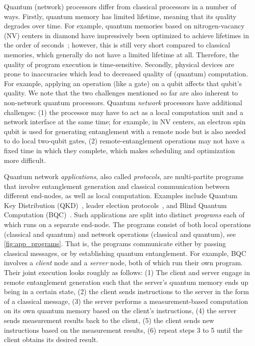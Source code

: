 Quantum (network) processors differ from classical processors in a number of ways.
Firstly, quantum memory has limited lifetime, meaning that its quality degrades over time.
For example, quantum memories based on nitrogen-vacancy (NV) centers in diamond have impressively been optimized to achieve lifetimes in the order of seconds~\cite{Abobeih2018};
however, this is still very short compared to classical memories, which generally do not have a limited lifetime at all.
Therefore, the quality of program execution is time-sensitive.
Secondly, physical devices are prone to inaccuracies which lead to decreased quality of (quantum) computation.
For example, applying an operation (like a gate) on a qubit affects that qubit's quality.
We note that the two challenges mentioned so far are also inherent to non-network quantum processors.
Quantum \textit{network} processors have additional challenges:
    (1) the processor may have to act as a local computation unit and a network interface at the same time;
    for example, in NV centers, an electron spin qubit is used for generating entanglement with a remote node but is also needed to do local two-qubit gates,
    (2) remote-entanglement operations may not have a fixed time in which they complete, which makes scheduling and optimization more difficult.

Quantum network \textit{applications}, also called \textit{protocols}, are multi-partite programs that involve entanglement generation and classical communication between different end-nodes, as well as local computation.
Examples include Quantum Key Distribution (QKD)~\cite{bb84, ekert1991quantum}, leader election protocols~\cite{kobayashi2014simpler, ganz2009quantum}, and Blind Quantum Computation (BQC)~\cite{Wehner2018stages}.
Such applications are split into distinct \textit{programs} each of which runs on a separate end-node.
The programs consist of both local operations (classical and quantum) and network operations (classical and quantum), see \cref{fig:app_programs}.
That is, the programs communicate either by passing classical messages, or by establishing quantum entanglement.
For example, BQC involves a \textit{client} node and a \textit{server} node, both of which run their own program.
Their joint execution looks roughly as follows:
    (1) The client and server engage in remote entanglement generation such that the server's quantum memory ends up being in a certain state,
    (2) the client sends instructions to the server in the form of a classical message,
    (3) the server performs a measurement-based computation on its own quantum memory based on the client's instructions,
    (4) the server sends measurement results back to the client,
    (5) the client sends new instructions based on the measurement results,
    (6) repeat steps 3 to 5 until the client obtains its desired result.

